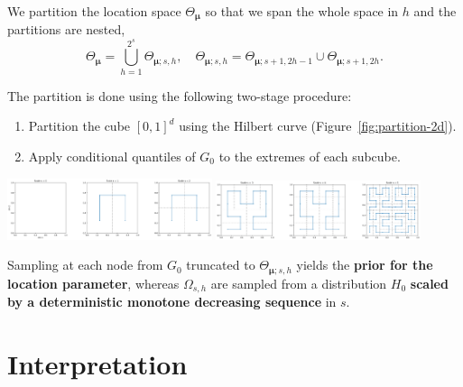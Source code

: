 \documentclass[a0,portrait]{a0poster}
\begin{document}
\begin{multicols}{2}
    We partition the location space $ \Theta_{\bm{\mu}}$ so that we span the whole space in $ h$ and the partitions are nested,
        \[
            \Theta_{\bm{\mu}} = \bigcup_{h=1}^{2^{s}} \Theta_{\bm{\mu}; s,h}, \quad  \Theta_{\bm{\mu}; s,h} = \Theta_{\bm{\mu}; s+1, 2h-1} \cup \Theta_{\bm{\mu};s+1, 2h}.
        \]

\vspace{.5cm}

The partition is done using the following two-stage procedure:
\begin{enumerate}
    \item Partition the cube $ [0,1]^{d}$ using the Hilbert curve (Figure~\ref{fig:partition-2d}).

    \item Apply conditional quantiles of $ G_0$ to the extremes of each subcube.
\end{enumerate}

\begin{center}
    \includegraphics[trim={0 0 0 0}, clip, width=0.45\textwidth]{figures/partition_2d_top2.png}
    \includegraphics[trim={0 0 0 0}, clip, width=0.45\textwidth]{figures/partition_2d_bot2.png}
    \label{fig:partition-2d}
\end{center}

Sampling at each node from $ G_0$ truncated to $ \Theta_{\bm{\mu}; s,h}$ yields the \textbf{prior for the location parameter}, whereas $ \Omega_{s,h}$ are sampled from a distribution $ H_0$ \textbf{scaled by a deterministic monotone decreasing sequence} in $ s$.
\color{DarkRed}
\section*{Interpretation}
\label{prop}
\color{Black}


\end{multicols}
\end{document}
